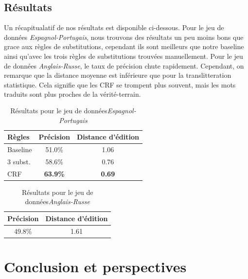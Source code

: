 \documentclass{article}
\begin{document}
\subsection{Résultats}
Un récapitualatif de nos résultats est disponible ci-dessous. Pour le jeu de données \emph{Espagnol-Portugais}, nous trouvons des résultats un peu moins bons que grace aux règles de substitutions, cependant ils sont meilleurs que notre baseline ainsi qu'avec les trois règles de substitutions trouvées manuellement. Pour le jeu de données \emph{Anglais-Russe}, le taux de précision chute rapidement. Cependant, on remarque que la distance moyenne est inférieure que pour la translitteration statistique. Cela signifie que les CRF se trompent plus souvent, mais les mots traduits sont plus proches de la vérité-terrain.

\begin{table}[H]
\caption{Résultats pour le jeu de données\emph{Espagnol-Portugais} }
\begin{center}
\begin{tabular}{|l|c|c|}
\hline
Règles&Précision&Distance d'édition\\
\hline
Baseline&51.0\%&1.06\\
\hline
3 subst.&58.6\%&0.76\\
\hline
CRF&\textbf{63.9\%}&\textbf{0.69}\\
\hline
\end{tabular}
\end{center}
\end{table}


\begin{table}
\caption{Résultats pour le jeu de données\emph{Anglais-Russe} }
\begin{center}
\begin{tabular}{|c|c|}
\hline
Précision&Distance d'édition\\
\hline
49.8\%&1.61\\
\hline
\end{tabular}
\end{center}
\end{table}


\section{Conclusion et perspectives}


\end{document}

